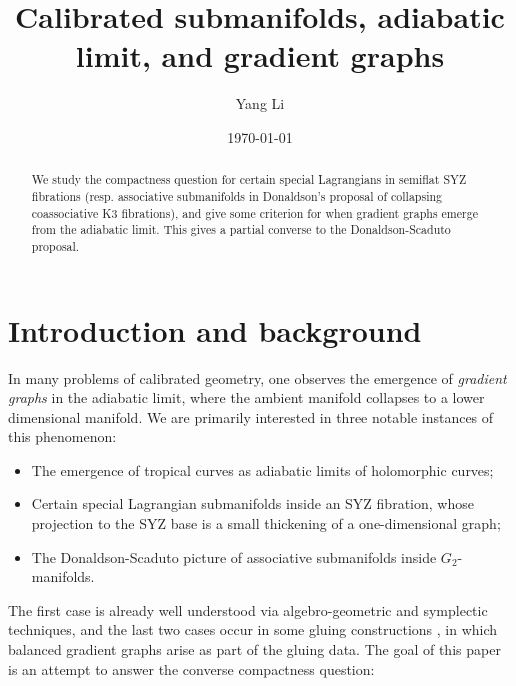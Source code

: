 \documentclass{article}
\date{\today}
\title{Calibrated submanifolds, adiabatic limit, and gradient graphs}
\author{Yang Li}
\theoremstyle{definition}
\begin{document}
		
		\maketitle
		
		
		
		\begin{abstract}
		We study the compactness question for certain special Lagrangians in semiflat SYZ fibrations (resp. associative submanifolds in Donaldson's proposal of collapsing coassociative K3 fibrations), and give some criterion for when gradient graphs emerge from the adiabatic limit. This gives a partial converse to the Donaldson-Scaduto proposal.
		\end{abstract}
		
		
		
		
		\section{Introduction and background}
		
		
		
		
		
		
		In many problems of calibrated geometry, one observes the emergence of \emph{gradient graphs} in the adiabatic limit, where the ambient manifold collapses to a lower dimensional manifold. We are primarily interested in three notable instances of this phenomenon:
		
		\begin{itemize}
			\item The emergence of tropical curves as adiabatic limits of holomorphic curves;
			
			
			\item Certain special Lagrangian submanifolds inside an SYZ fibration, whose projection to the SYZ base is a small thickening of a one-dimensional graph;
			
			\item The Donaldson-Scaduto picture of associative submanifolds inside $G_2$-manifolds.
			
			
		\end{itemize}
		
		
		
		The first case is already well understood via algebro-geometric and symplectic techniques, and the last two cases occur in some gluing constructions \cite{ChiuLiLin,ChiuLin}, in which balanced gradient graphs arise as part of the gluing data. The goal of this paper is an attempt to answer the converse compactness question: 
		
\end{document}
